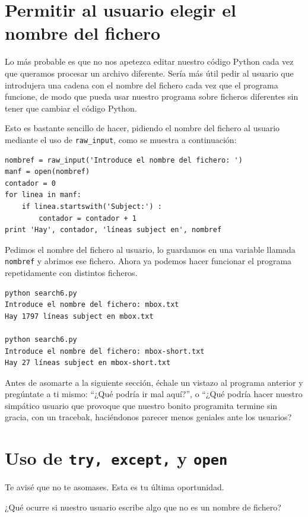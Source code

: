 \section{Permitir al usuario elegir el nombre del fichero}

Lo más probable es que no nos apetezca editar nuestro código Python
cada vez que queramos procesar un archivo diferente. Sería
más útil pedir al usuario que introdujera una cadena con el nombre del fichero
cada vez que el programa funcione, de modo que pueda usar nuestro
programa sobre ficheros diferentes sin tener que cambiar el código Python.

Esto es bastante sencillo de hacer, pidiendo el nombre del fichero al
usuario mediante el uso de \verb"raw_input", como se muestra a continuación:

\beforeverb
\begin{verbatim}
nombref = raw_input('Introduce el nombre del fichero: ')
manf = open(nombref)
contador = 0
for linea in manf:
    if linea.startswith('Subject:') :
        contador = contador + 1
print 'Hay', contador, 'líneas subject en', nombref
\end{verbatim}
\afterverb
%
Pedimos el nombre del fichero al usuario, lo guardamos en una variable
llamada {\tt nombref} y abrimos ese fichero. Ahora ya podemos hacer funcionar
el programa repetidamente con distintos ficheros.

\beforeverb
\begin{verbatim}
python search6.py 
Introduce el nombre del fichero: mbox.txt
Hay 1797 líneas subject en mbox.txt

python search6.py 
Introduce el nombre del fichero: mbox-short.txt
Hay 27 líneas subject en mbox-short.txt
\end{verbatim}
\afterverb
%
Antes de asomarte a la siguiente sección, échale un vistazo al programa anterior
y pregúntate a ti mismo: ``¿Qué podría ir mal aquí?'', o ``¿Qué podría hacer
nuestro simpático usuario que provoque que nuestro bonito programita
termine sin gracia, con un tracebak, haciéndonos parecer menos geniales
ante los usuarios?

\section{Uso de {\tt try, except,} y {\tt open}}

Te avisé que no te asomases. Esta es tu última oportunidad.

¿Qué ocurre si nuestro usuario escribe algo que no es un nombre de fichero?

